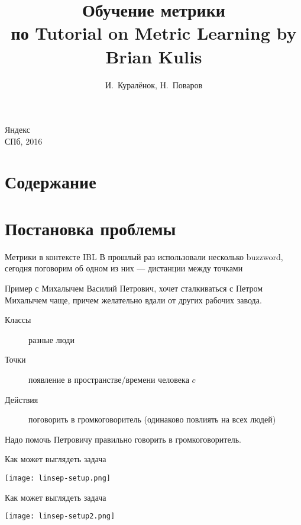 \documentclass[14pt, fleqn, xcolor={dvipsnames, table}]{beamer}
\title{Обучение метрики\\\small{по Tutorial on Metric Learning by Brian Kulis}}
\author[]{\small{%
И.~Куралёнок,
Н.~Поваров}}
\date{}
\begin{document}
\begin{frame}
\maketitle
\small
\begin{center}
\vspace{-60pt}
\normalsize {\color{red}Я}ндекс \\
\vspace{80pt}
\footnotesize СПб, 2016
\end{center}
\end{frame}

\section{Содержание}
\section{Постановка проблемы}
\begin{frame}{Метрики в контексте IBL}
В прошлый раз использовали несколько buzzword, сегодня поговорим об одном из них --- дистанции между точками
\end{frame}

\begin{frame}{Пример с Михалычем}
Василий Петрович, хочет сталкиваться с Петром Михалычем чаще, причем желательно вдали от других рабочих завода.
\begin{description}
\item[Классы] разные люди
\item[Точки] появление в пространстве/времени человека $c$
\item[Действия] поговорить в громкоговоритель (одинаково повлиять на всех людей)
\end{description}
Надо помочь Петровичу правильно говорить в громкоговоритель.
\end{frame}

\begin{frame}{Как может выглядеть задача}
\begin{center}
\texttt{[image: linsep-setup.png]}
\end{center}
\end{frame}

\begin{frame}{Как может выглядеть задача}
\begin{center}
\texttt{[image: linsep-setup2.png]}
\end{center}
\end{frame}
\end{document}
